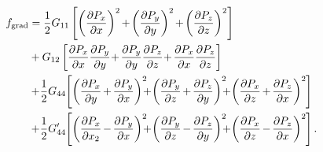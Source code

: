 \documentclass[22pt]{article} %
\begin{document}
\begin{align}\nonumber
f_\mathrm{grad} &= \frac{1}{2} G_{11} \left[\left(\frac{\partial P_x}{\partial x} \right)^2 \hspace{-1pt}+\hspace{-1pt} \left(\frac{\partial P_y}{\partial y}\right)^2 \hspace{-1pt}+\hspace{-1pt}\left( \frac{\partial P_z}{\partial z} \right)^2\right] \\ \nonumber
&+ G_{12} \left[\frac{\partial P_x}{\partial x}\frac{\partial P_y}{\partial y}\hspace{-2pt} +\hspace{-1pt} \frac{\partial P_y}{\partial y} \frac{\partial P_z}{\partial z}\hspace{-2pt} +\hspace{-1pt} \frac{\partial P_x}{\partial x} \frac{\partial P_z}{\partial z} \right] \\ \nonumber
&+ \hspace{-2pt} \frac{1}{2} G_{44}  \hspace{-2pt}\left[\left(\frac{\partial P_x}{\partial y} \hspace{-1pt}+ \hspace{-1pt} \frac{\partial P_y}{\partial x} \right)^2 \hspace{-6pt}+\hspace{-2pt} \left(\frac{\partial P_y}{\partial z} \hspace{-1pt}+ \hspace{-1pt}\frac{\partial P_z}{\partial y} \right)^2 \hspace{-6pt}+\hspace{-2pt} \left(\frac{\partial P_x}{\partial z} \hspace{-1pt}+\hspace{-1pt} \frac{\partial P_z}{\partial x} \right)^2  \hspace{-0.5pt}\right] \\ \nonumber
&+ \hspace{-2pt}\frac{1}{2} G'_{44} \hspace{-2pt}\left[\left(\frac{\partial P_x}{\partial x_2} \hspace{-1pt}- \hspace{-1pt}\frac{\partial P_y}{\partial x} \right)^2 \hspace{-6pt} + \hspace{-2pt} \left(\frac{\partial P_y}{\partial z}\hspace{-1pt} - \hspace{-1pt}\frac{\partial P_z}{\partial y} \right)^2 \hspace{-6pt}+  \hspace{-2pt}\left(\frac{\partial P_x}{\partial z}\hspace{-1pt} - \hspace{-1pt}\frac{\partial P_z}{\partial x} \right)^2 \hspace{-0.5pt} \right].
\end{align}
\end{document}
